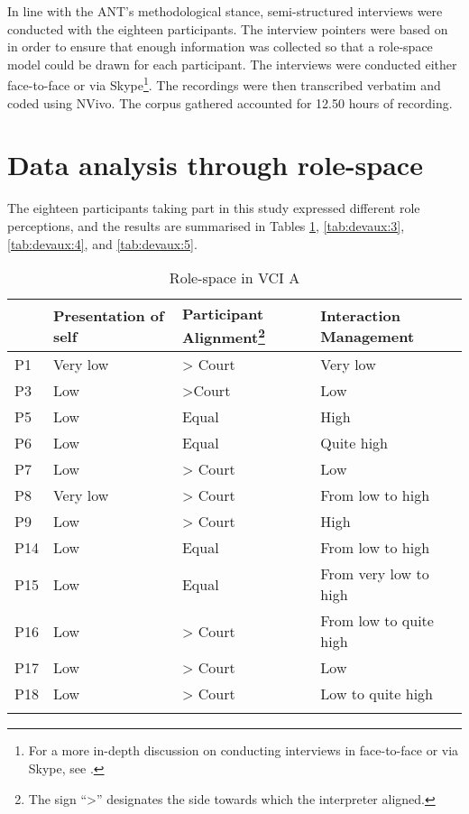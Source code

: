 \documentclass[output=paper]{langsci/langscibook}
\begin{document}
In line with the ANT’s methodological stance, semi-structured interviews were conducted with the eighteen participants. The interview pointers were based on  in order to ensure that enough information was collected so that a role-space model could be drawn for each participant. The interviews were conducted either face-to-face or via Skype\footnote{For a more in-depth discussion on conducting interviews in face-to-face or via Skype, see \citet{Devaux2017b}.}. The recordings were then transcribed verbatim and coded using NVivo. The corpus gathered accounted for 12.50 hours of recording. 

\section{Data analysis through role-space}

The eighteen participants taking part in this study expressed different role perceptions, and the results are summarised in Tables \ref{tab:devaux:2}, \ref{tab:devaux:3}, \ref{tab:devaux:4}, and \ref{tab:devaux:5}.

\begin{table}
\begin{tabular}{llll}
\lsptoprule
   & {Presentation of self} & Participant Alignment\footnote{The sign “>” designates the side towards which the interpreter aligned.} & {Interaction Management}\\\midrule
P1 & Very low & > Court & Very low\\
P3 & Low & >Court & Low\\
P5 & Low & Equal & High\\
P6 & Low & Equal & Quite high \\
P7 & Low & > Court & Low\\
P8 & Very low & > Court & From low to high\\
P9 & Low & > Court & High\\
P14 & Low & Equal & From low to high\\
P15 & Low & Equal & From very low to high\\
P16 & Low & > Court & From low to quite high\\
P17 & Low & > Court & Low\\
P18 & Low & > Court & Low to quite high\\
\lspbottomrule
\end{tabular}
\caption{Role-space in VCI A\label{tab:devaux:2}}
\end{table}
\end{document}
